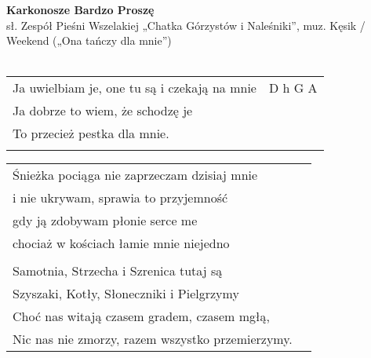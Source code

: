 \documentclass[a5paper]{article}
\begin{document}


\noindent
\fontsize{12pt}{15pt}\selectfont
\textbf{Karkonosze Bardzo Proszę} \\
\fontsize{8pt}{10pt}\selectfont
sł. Zespół Pieśni Wszelakiej „Chatka Górzystów i Naleśniki”, muz. Kęsik / Weekend („Ona tańczy dla mnie”) \\ \\
\fontsize{10pt}{12pt}\selectfont

\begin{tabular}{@{}p{7.50cm}p{3cm}@{}}
\noindent
Ja uwielbiam je, one tu są i czekają na mnie & D h G A \\
Ja dobrze to wiem, że schodzę je \\
To przecież pestka dla mnie. \\ \\
\end{tabular}

\noindent
\begin{tabular}{@{}p{8.50cm}p{3cm}@{}}
Śnieżka pociąga nie zaprzeczam dzisiaj mnie \\
i nie ukrywam, sprawia to przyjemność \\
gdy ją zdobywam płonie serce me \\
chociaż w kościach łamie mnie niejedno \\ \\

Samotnia, Strzecha i Szrenica tutaj są \\
Szyszaki, Kotły, Słoneczniki i Pielgrzymy \\
Choć nas witają czasem gradem, czasem mgłą, \\
Nic nas nie zmorzy, razem wszystko przemierzymy.
\end{tabular}
\end{document}
